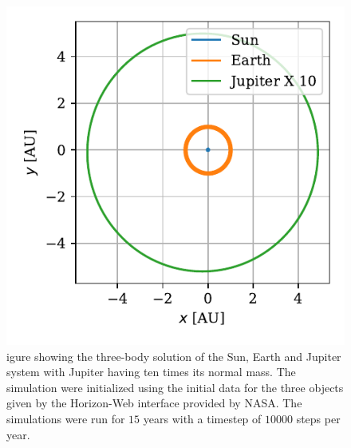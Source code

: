 \documentclass[twocolumn]{aastex62}
\begin{document}
\begin{figure}
\includegraphics[scale=1]{Figures/jupiter10.pdf}
\caption{igure showing the three-body solution of the Sun, Earth and Jupiter system
with Jupiter having ten times its normal mass. The simulation were initialized using the
initial data for the three objects given by the Horizon-Web interface provided by NASA. The simulations
were run for $15$ years with a timestep of $10000$ steps per year.}
\label{fig:jupiter10}
\end{figure}
\end{document}
